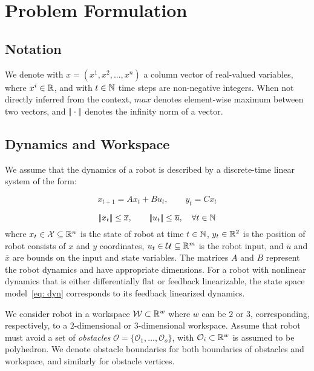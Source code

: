 \section{Problem Formulation}

\subsection{Notation}

We denote with $x = (x^1, x^2, ..., x^n)$ a column vector of real-valued variables, where $x^i \in {\mathbb{R}}$,
and with $t \in {\mathbb{N}}$ time steps are non-negative integers. 
When not directly inferred from the context, $max$ denotes element-wise maximum between two vectors, 
and $|\!|\cdot|\!|$ denotes the infinity norm of a vector.


\subsection{Dynamics and Workspace}

We assume that the dynamics of a robot is described by a discrete-time linear system of the form:

\begin{equation}
    \label{eq:dyn}    
    x_{t+1} = A x_{t} + B u_{t}, \qquad y_{t} = C x_{t} 
\end{equation}

\begin{equation}
    \label{eq:ulimit}    
    |\!|x_t|\!| \le \overline{x}, \qquad |\!|u_t|\!| \le \overline{u}, \quad \forall t \in {\mathbb{N}}
\end{equation}
where $x_t \in \mathcal{X} \subseteq {\mathbb{R}}^{n}$ is the state of robot at time $t \in {\mathbb{N}}$, 
$y_t \in {\mathbb{R}}^{2}$ is the position of robot consists of $x$ and $y$ coordinates,
$u_t \in \mathcal{U} \subseteq {\mathbb{R}}^{m}$ is the robot input,
and $\overline{u}$ and $\overline{x}$ are bounds on the input and state variables. 
The matrices $A$ and $B$ represent the robot dynamics and have appropriate dimensions. 
For a robot with nonlinear dynamics that is either differentially flat or feedback linearizable, 
the state space model~\eqref{eq: dyn} corresponds to its feedback linearized dynamics.

We consider robot in a workspace ${\mathcal{W}} \subset {\mathbb{R}}^{w}$ where $w$ can be $2$ or $3$, 
corresponding,  respectively, to a $2$-dimensional or $3$-dimensional workspace. 
Assume that robot must avoid a set of \emph{obstacles} $\mathcal{O} = \{\mathcal{O}_1, \ldots, \mathcal{O}_o\}$, 
with $\mathcal{O}_i \subset {\mathbb{R}}^w$ is assumed to be polyhedron.
We denote obstacle boundaries for both boundaries of obstacles and workspace, and similarly for obstacle vertices. 



